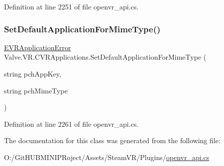 Definition at line 2251 of file openvr\+\_\+api.\+cs.

\mbox{\label{class_valve_1_1_v_r_1_1_c_v_r_applications_afa7ac9cfb351f15a0127e3008f90ae02}} 
\subsubsection{\texorpdfstring{SetDefaultApplicationForMimeType()}{SetDefaultApplicationForMimeType()}}
{\footnotesize\ttfamily \mbox{\hyperlink{namespace_valve_1_1_v_r_a3488adab8a219b579fcee50f4e63a8b6}{E\+V\+R\+Application\+Error}} Valve.\+V\+R.\+C\+V\+R\+Applications.\+Set\+Default\+Application\+For\+Mime\+Type (\begin{DoxyParamCaption}\item[{string}]{pch\+App\+Key,  }\item[{string}]{pch\+Mime\+Type }\end{DoxyParamCaption})}



Definition at line 2261 of file openvr\+\_\+api.\+cs.



The documentation for this class was generated from the following file\+:\begin{DoxyCompactItemize}
\item 
O\+:/\+Git\+H\+U\+B\+M\+I\+N\+I\+P\+Roject/\+Assets/\+Steam\+V\+R/\+Plugins/\mbox{\hyperlink{openvr__api_8cs}{openvr\+\_\+api.\+cs}}\end{DoxyCompactItemize}
